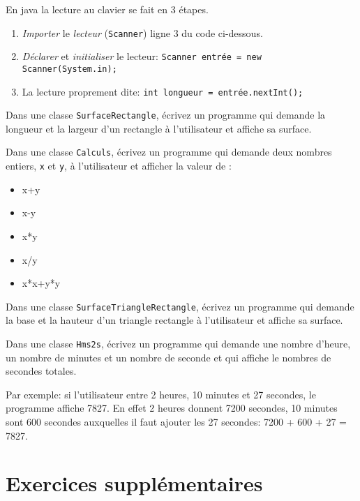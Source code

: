 \documentclass[a4paper,11pt]{article}
\begin{document}
	En java la lecture au clavier se fait en 3 étapes.

	\begin{enumerate}
		\item \emph{Importer} le \emph{lecteur} (\texttt{Scanner}) ligne 3 du code ci-dessous.
		\item \emph{Déclarer} et \emph{initialiser} le lecteur:  \texttt{Scanner entrée = new Scanner(System.in);}
		\item La lecture proprement dite: \texttt{int longueur = entrée.nextInt();}
	\end{enumerate}


	\hspeparator


		Dans une classe \texttt{SurfaceRectangle}, écrivez un programme qui demande 
		la longueur et la largeur d'un rectangle à l'utilisateur et affiche sa surface.


	\Exercice{} 
		Dans une classe \texttt{Calculs}, écrivez un programme qui demande 
		deux nombres entiers, \texttt{x} et \texttt{y}, à l'utilisateur et afficher la valeur de :
		\begin{itemize}
		 	\item x+y
			\item x-y
			\item x*y
			\item x/y
			\item x*x+y*y
		\end{itemize} 


		Dans une classe \texttt{SurfaceTriangleRectangle}, écrivez un programme qui demande 
		la base et la hauteur d'un triangle rectangle à l'utilisateur et affiche sa surface.

		Dans une classe \texttt{Hms2s}, écrivez un programme qui demande 
		une nombre d'heure, un nombre de minutes et un nombre de seconde
		et qui affiche le nombres de secondes totales.
		
		Par exemple: si l'utilisateur entre 2 heures, 10 minutes et 27 secondes, le programme affiche
		7827. En effet 2 heures donnent 7200 secondes, 10 minutes sont 600 secondes 
		auxquelles il faut ajouter les 27 secondes: 7200 + 600 + 27 = 7827. 




\section{Exercices supplémentaires}
\end{document}
